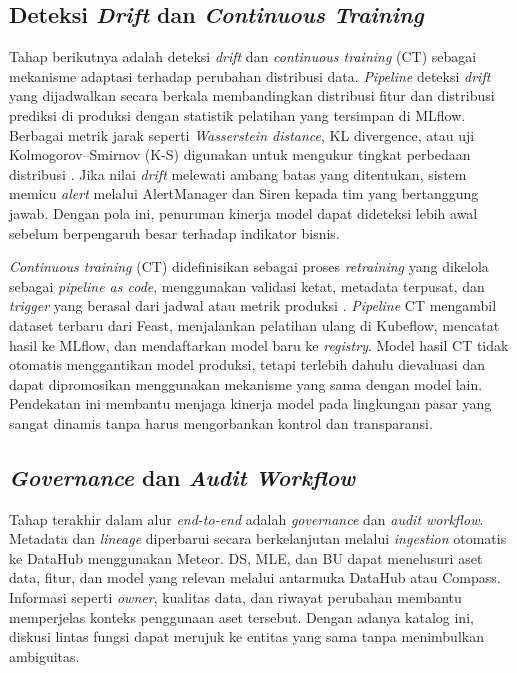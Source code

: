 \subsection{Deteksi \textit{Drift} dan \textit{Continuous Training}}

Tahap berikutnya adalah deteksi \textit{drift} dan \textit{continuous training} (CT) sebagai mekanisme adaptasi terhadap perubahan distribusi data. \textit{Pipeline} deteksi \textit{drift} yang dijadwalkan secara berkala membandingkan distribusi fitur dan distribusi prediksi di produksi dengan statistik pelatihan yang tersimpan di MLflow. Berbagai metrik jarak seperti \textit{Wasserstein distance}, KL divergence, atau uji Kolmogorov–Smirnov (K-S) digunakan untuk mengukur tingkat perbedaan distribusi \textcite{reis2016kdd}. Jika nilai \textit{drift} melewati ambang batas yang ditentukan, sistem memicu \textit{alert} melalui AlertManager dan Siren kepada tim yang bertanggung jawab. Dengan pola ini, penurunan kinerja model dapat dideteksi lebih awal sebelum berpengaruh besar terhadap indikator bisnis.

\textit{Continuous training} (CT) didefinisikan sebagai proses \textit{retraining} yang dikelola sebagai \textit{pipeline as code}, menggunakan validasi ketat, metadata terpusat, dan \textit{trigger} yang berasal dari jadwal atau metrik produksi \autocite{liang2024automating}. \textit{Pipeline} CT mengambil dataset terbaru dari Feast, menjalankan pelatihan ulang di Kubeflow, mencatat hasil ke MLflow, dan mendaftarkan model baru ke \textit{registry}. Model hasil CT tidak otomatis menggantikan model produksi, tetapi terlebih dahulu dievaluasi dan dapat dipromosikan menggunakan mekanisme yang sama dengan model lain. Pendekatan ini membantu menjaga kinerja model pada lingkungan pasar yang sangat dinamis \autocite{cespedes2024efficient,bayram2022concept,vela2022temporal} tanpa harus mengorbankan kontrol dan transparansi.

\subsection{\textit{Governance} dan \textit{Audit Workflow}}

Tahap terakhir dalam alur \textit{end-to-end} adalah \textit{governance} dan \textit{audit workflow}. Metadata dan \textit{lineage} diperbarui secara berkelanjutan melalui \textit{ingestion} otomatis ke DataHub menggunakan Meteor. DS, MLE, dan BU dapat menelusuri aset data, fitur, dan model yang relevan melalui antarmuka DataHub atau Compass. Informasi seperti \textit{owner}, kualitas data, dan riwayat perubahan membantu memperjelas konteks penggunaan aset tersebut. Dengan adanya katalog ini, diskusi lintas fungsi dapat merujuk ke entitas yang sama tanpa menimbulkan ambiguitas.

